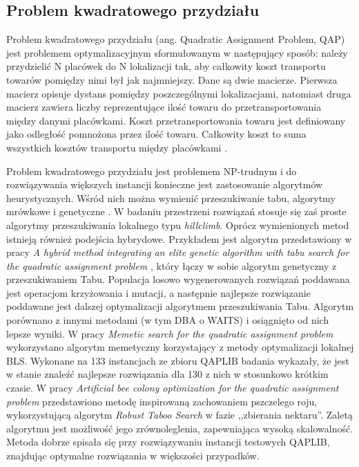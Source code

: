 \subsection{Problem kwadratowego przydziału}
Problem kwadratowego przydziału (ang. Quadratic Assignment Problem, QAP) jest problemem optymalizacyjnym sformułowanym w następujący sposób:
należy przydzielić N placówek do N lokalizacji tak, aby całkowity koszt transportu towarów pomiędzy nimi był jak najmniejszy.
Dane są dwie macierze. Pierwsza macierz opisuje dystans pomiędzy poszczególnymi lokalizacjami, natomiast druga macierz
zawiera liczby reprezentujące ilość towaru do przetransportowania między danymi placówkami.
Koszt przetransportowania towaru jest definiowany jako odległość pomnożona przez ilość towaru.
Całkowity koszt to suma wszystkich kosztów transportu między placówkami \cite{doi:10.1287/mnsc.9.4.586}.

Problem kwadratowego przydziału jest problemem NP-trudnym i do rozwiązywania większych instancji konieczne jest zastosowanie algorytmów
heurystycznych. Wśród nich można wymienić przeszukiwanie tabu, algorytmy mrówkowe i genetyczne \cite{DBLP:journals/concurrency/AcharyPPMGE21}.
W badaniu przestrzeni rozwiązań stosuje się zaś proste algorytmy przeszukiwania lokalnego typu \textit{hillclimb}.
Oprócz wymienionych metod istnieją również podejścia hybrydowe.
Przykładem jest algorytm przedstawiony w pracy \textit{A hybrid method integrating an elite genetic algorithm with tabu search for the quadratic assignment problem} \cite{DBLP:journals/isci/ZhangLZZ20},
który łączy w sobie algorytm genetyczny z przeszukiwaniem Tabu. Populacja losowo wygenerowanych rozwiązań
poddawana jest operacjom krzyżowania i mutacji, a następnie najlepsze rozwiązanie poddawane jest dalszej optymalizacji algorytmem przeszukiwania Tabu.
Algorytm porównano z innymi metodami (w tym DBA o WAITS) i osiągnięto od nich lepsze wyniki.
W pracy \textit{Memetic search for the quadratic assignment problem} \cite{DBLP:journals/eswa/BenlicH15} wykorzystano algorytm memetyczny korzystający z metody optymalizacji lokalnej
BLS. Wykonane na 133 instancjach ze zbioru QAPLIB badania wykazały, że jest w stanie znaleźć najlepsze rozwiązania dla 130 z nich w stosunkowo krótkim czasie.
W pracy \textit{Artificial bee colony optimization for the quadratic assignment problem} \cite{DBLP:journals/asc/DokerogluSC19} przedstawiono metodę inspirowaną zachowaniem pszczelego roju,
wykorzystującą algorytm \textit{Robust Taboo Search} w fazie ,,zbierania nektaru''. Zaletą algorytmu jest możliwość jego zrównoleglenia,
zapewniająca wysoką skalowalność. Metoda dobrze spisała się przy rozwiązywaniu instancji testowych QAPLIB, znajdując optymalne rozwiązania w większości przypadków.


